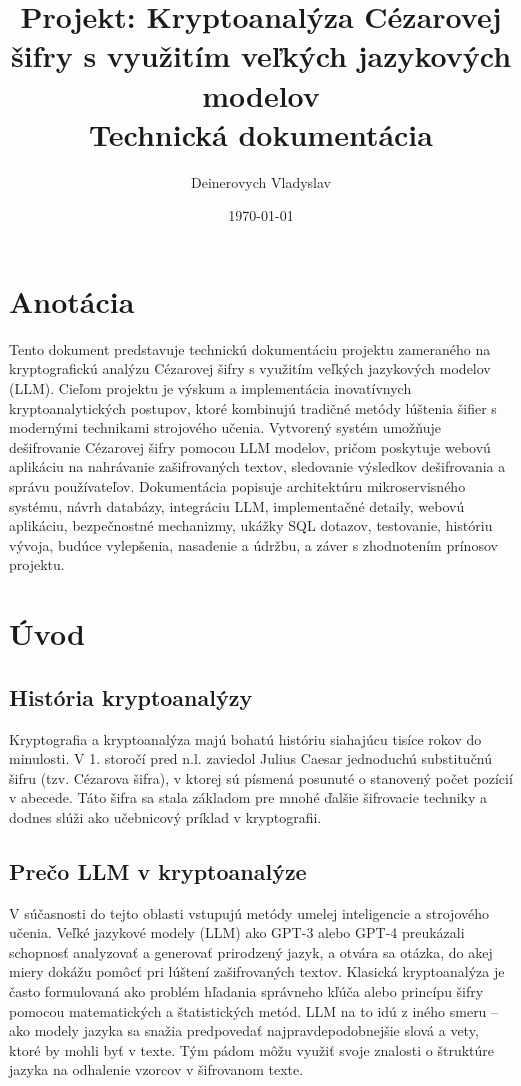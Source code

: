 \documentclass[12pt,a4paper]{article}
\title{Projekt: Kryptoanalýza Cézarovej šifry s využitím veľkých jazykových modelov\\\large Technická dokumentácia}
\author{Deinerovych Vladyslav}
\date{\today}
\begin{document}
\maketitle

\tableofcontents
\newpage

\section{Anotácia}
Tento dokument predstavuje technickú dokumentáciu projektu zameraného na kryptografickú analýzu Cézarovej šifry s využitím veľkých jazykových modelov (LLM). Cieľom projektu je výskum a implementácia inovatívnych kryptoanalytických postupov, ktoré kombinujú tradičné metódy lúštenia šifier s modernými technikami strojového učenia. Vytvorený systém umožňuje dešifrovanie Cézarovej šifry pomocou LLM modelov, pričom poskytuje webovú aplikáciu na nahrávanie zašifrovaných textov, sledovanie výsledkov dešifrovania a správu používateľov. Dokumentácia popisuje architektúru mikroservisného systému, návrh databázy, integráciu LLM, implementačné detaily, webovú aplikáciu, bezpečnostné mechanizmy, ukážky SQL dotazov, testovanie, históriu vývoja, budúce vylepšenia, nasadenie a údržbu, a záver s zhodnotením prínosov projektu.

\section{Úvod}
\subsection{História kryptoanalýzy}
Kryptografia a kryptoanalýza majú bohatú históriu siahajúcu tisíce rokov do minulosti. V 1. storočí pred n.l. zaviedol Julius Caesar jednoduchú substitučnú šifru (tzv. Cézarova šifra), v ktorej sú písmená posunuté o stanovený počet pozícií v abecede. Táto šifra sa stala základom pre mnohé ďalšie šifrovacie techniky a dodnes slúži ako učebnicový príklad v kryptografii.

\subsection{Prečo LLM v kryptoanalýze}
V súčasnosti do tejto oblasti vstupujú metódy umelej inteligencie a strojového učenia. Veľké jazykové modely (LLM) ako GPT-3 alebo GPT-4 preukázali schopnosť analyzovať a generovať prirodzený jazyk, a otvára sa otázka, do akej miery dokážu pomôcť pri lúštení zašifrovaných textov. Klasická kryptoanalýza je často formulovaná ako problém hľadania správneho kľúča alebo princípu šifry pomocou matematických a štatistických metód. LLM na to idú z iného smeru -- ako modely jazyka sa snažia predpovedať najpravdepodobnejšie slová a vety, ktoré by mohli byť v texte. Tým pádom môžu využiť svoje znalosti o štruktúre jazyka na odhalenie vzorcov v šifrovanom texte.
\end{document}
